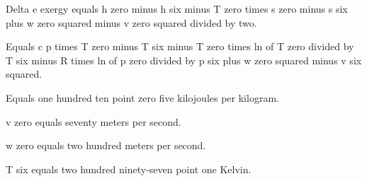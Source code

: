 Delta e exergy equals h zero minus h six minus T zero times s zero minus s six plus w zero squared minus v zero squared divided by two.

Equals c p times T zero minus T six minus T zero times ln of T zero divided by T six minus R times ln of p zero divided by p six plus w zero squared minus v six squared.

Equals one hundred ten point zero five kilojoules per kilogram.

v zero equals seventy meters per second.

w zero equals two hundred meters per second.

T six equals two hundred ninety-seven point one Kelvin.